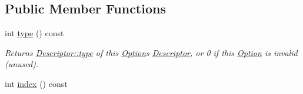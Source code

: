 \subsection*{Public Member Functions}
\begin{DoxyCompactItemize}
\item 
int \hyperlink{classoption_1_1Option_a6560fa0526e2affd87d5a10622336af4}{type} () const 
\begin{DoxyCompactList}\small\item\em Returns \hyperlink{structoption_1_1Descriptor_a1b220dabd8aad075fa441a80f9b9343c}{Descriptor\+::type} of this \hyperlink{classoption_1_1Option}{Option}\textquotesingle{}s \hyperlink{structoption_1_1Descriptor}{Descriptor}, or 0 if this \hyperlink{classoption_1_1Option}{Option} is invalid (unused). \end{DoxyCompactList}\item 
int \hyperlink{classoption_1_1Option_ac0acba91bbfcca0c35cfc54f197b15d2}{index} () const \hypertarget{classoption_1_1Option_ac0acba91bbfcca0c35cfc54f197b15d2}{}\label{classoption_1_1Option_ac0acba91bbfcca0c35cfc54f197b15d2}


\end{DoxyCompactItemize}
